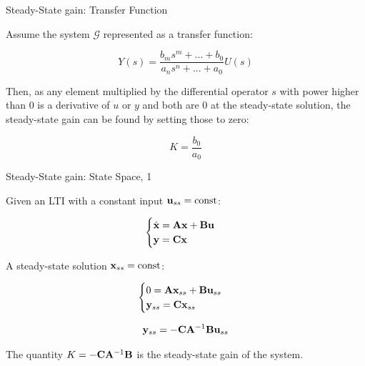 \documentclass{beamer}
\begin{document}
\begin{frame}{Steady-State gain: Transfer Function}
	\begin{flushleft}
		
		Assume the system  $\mathcal{G}$ represented as a transfer function:
		
		\begin{equation}
			Y(s) = \frac{b_m s^m + ... + b_0}{a_n s^n + ... + a_0} U(s)
		\end{equation}
		
		\bigskip
		
		Then, as any element multiplied by the differential operator $s$ with power higher than 0 is a derivative of $u$ or $y$ and both are 0 at the steady-state solution, the steady-state gain can be found by setting those to zero:
		
		\begin{equation}
			K = \frac{b_0}{a_0}
		\end{equation}		

\end{flushleft}
\end{frame}		



\begin{frame}{Steady-State gain: State Space, 1}
	\begin{flushleft}
		
		Given an LTI with a constant input $\mathbf{u}_{ss} = \text{const}$:
		
		\begin{equation}
			\begin{cases}
				\dot{\mathbf{x}} = \mathbf{A}\mathbf{x} + \mathbf{B}\mathbf{u}
				\\
				\mathbf{y} = \mathbf{C}\mathbf{x}
			\end{cases}
		\end{equation}
		
		A steady-state solution $\mathbf{x}_{ss} = \text{const}$:
		
		\begin{equation}
		\begin{cases}
			0 = \mathbf{A}\mathbf{x}_{ss} + \mathbf{B}\mathbf{u}_{ss}
			\\
			\mathbf{y}_{ss} = \mathbf{C}\mathbf{x}_{ss} 
		\end{cases}
		\end{equation}
		
		\begin{equation}
				\mathbf{y}_{ss} = -\mathbf{C} \mathbf{A}^{-1}\mathbf{B}\mathbf{u}_{ss}
		\end{equation}
		
		
		The quantity $K =-\mathbf{C} \mathbf{A}^{-1}\mathbf{B}$ is the steady-state gain of the system.
		
	\end{flushleft}
\end{frame}
\end{document}
